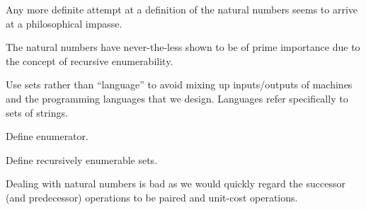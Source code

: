 


Any more definite attempt at a definition of the natural numbers seems to
arrive at a philosophical impasse.

The natural numbers have never-the-less shown to be of prime importance due to
the concept of recursive enumerability.

Use sets rather than ``language'' to avoid mixing up inputs/outputs of machines
and the programming languages that we design. Languages refer specifically to
sets of strings.

\begin{definition}

Define enumerator.

\end{definition}

\begin{definition}

Define recursively enumerable sets.

\end{definition}

Dealing with natural numbers is bad as we would quickly regard the successor
(and predecessor) operations to be paired and unit-cost operations.





